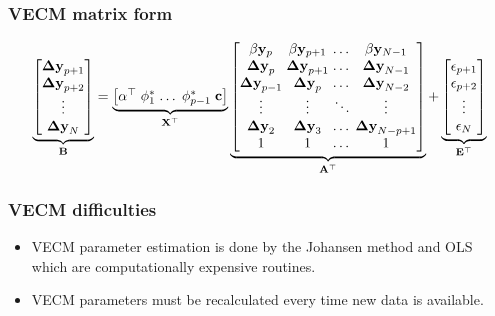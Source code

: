 \documentclass[xcolor=dvipsnames]{beamer}
\begin{document}
\begin{frame}
\frametitle{VECM matrix form}
\small
\begin{equation*}
\underbrace{
      \begin{bmatrix}
       \mathbf{\Delta y}_{p+1}  \\ 
       \mathbf{\Delta y}_{p+2}  \\ 
       \vdots                   \\ 
       \mathbf{\Delta y}_N      
      \end{bmatrix}}_{\mathbf{B} } =
\arraycolsep=1.4pt  
\underbrace{\begin{bmatrix}
   \alpha^\top & \phi^*_1 & \dots & \phi^*_{p-1} &\mathbf{c}   
  \end{bmatrix}}_{\mathbf{X}^\top}
\underbrace{\begin{bmatrix}
 \beta\mathbf{y}_p      & \beta\mathbf{y}_{p+1}   & \dots&   \beta\mathbf{y}_{N-1}   \\
 \mathbf{\Delta y}_{p}   & \mathbf{\Delta y}_{p+1}& \dots &  \mathbf{\Delta y}_{N-1} \\
 \mathbf{\Delta y}_{p-1} & \mathbf{\Delta y}_{p}  & \dots &  \mathbf{\Delta y}_{N-2}   \\
 \vdots                  & \vdots                 & \ddots&  \vdots                   \\
 \mathbf{\Delta y}_{2}   & \mathbf{\Delta y}_{3} & \dots &   \mathbf{\Delta y}_{N-p+1} \\
 1                      & 1                       & \dots     & 1   
 \end{bmatrix}}_{\mathbf{A}^\top}
+
\underbrace{\begin{bmatrix}
              \mathbf{\epsilon}_{p+1} \\ 
              \mathbf{\epsilon}_{p+2} \\ 
              \vdots \\ 
              \mathbf{\epsilon}_N
             \end{bmatrix}}_{\mathbf{E}^\top}
\end{equation*}
\end{frame}

\begin{frame}
\frametitle{VECM difficulties}
\begin{itemize}
\item VECM parameter estimation is done by the Johansen method and OLS which are
computationally expensive routines.
\item VECM parameters must be recalculated every time new data is available. 
\end{itemize}
\end{frame}
\end{document}
